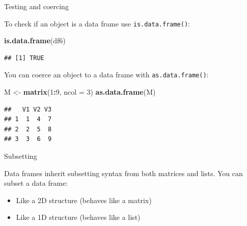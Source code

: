 \documentclass[ignorenonframetext,]{beamer}
\newenvironment{Shaded}{\begin{snugshade}}{\end{snugshade}}
\newcommand{\DataTypeTok}[1]{\textcolor[rgb]{0.13,0.29,0.53}{#1}}
\newcommand{\DecValTok}[1]{\textcolor[rgb]{0.00,0.00,0.81}{#1}}
\newcommand{\KeywordTok}[1]{\textcolor[rgb]{0.13,0.29,0.53}{\textbf{#1}}}
\newcommand{\NormalTok}[1]{#1}
\newcommand{\OperatorTok}[1]{\textcolor[rgb]{0.81,0.36,0.00}{\textbf{#1}}}
\newcommand{\StringTok}[1]{\textcolor[rgb]{0.31,0.60,0.02}{#1}}
\providecommand{\tightlist}{%
  \setlength{\itemsep}{0pt}\setlength{\parskip}{0pt}}
\begin{document}
\begin{frame}[fragile]{Testing and coercing}
\protect\hypertarget{testing-and-coercing}{}

To check if an object is a data frame use \texttt{is.data.frame()}:

\begin{Shaded}
\begin{Highlighting}[]
\KeywordTok{is.data.frame}\NormalTok{(df6)}
\end{Highlighting}
\end{Shaded}

\begin{verbatim}
## [1] TRUE
\end{verbatim}

You can coerce an object to a data frame with \texttt{as.data.frame()}:

\begin{Shaded}
\begin{Highlighting}[]
\NormalTok{M <-}\StringTok{ }\KeywordTok{matrix}\NormalTok{(}\DecValTok{1}\OperatorTok{:}\DecValTok{9}\NormalTok{, }\DataTypeTok{ncol =} \DecValTok{3}\NormalTok{)}
\KeywordTok{as.data.frame}\NormalTok{(M)}
\end{Highlighting}
\end{Shaded}

\begin{verbatim}
##   V1 V2 V3
## 1  1  4  7
## 2  2  5  8
## 3  3  6  9
\end{verbatim}

\end{frame}

\begin{frame}{Subsetting}
\protect\hypertarget{subsetting}{}

Data frames inherit subsetting syntax from both matrices and lists. You
can subset a data frame:

\begin{itemize}
\tightlist
\item
  Like a 2D structure (behaves like a matrix)
\item
  Like a 1D structure (behaves like a list)
\end{itemize}

\end{frame}
\end{document}
